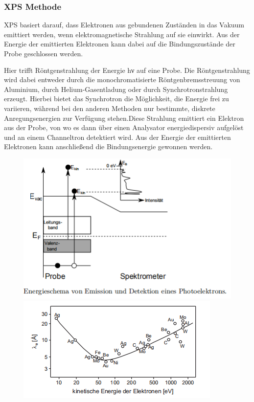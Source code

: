 \documentclass[12pt,UTF8]{article}
\begin{document}
\subsubsection{XPS Methode}
XPS basiert darauf, dass Elektronen aus gebundenen Zuständen in das Vakuum emittiert werden, wenn elektromagnetische Strahlung auf sie einwirkt. Aus der Energie der emittierten Elektronen kann dabei auf die Bindungszustände der Probe geschlossen werden.

Hier trifft Röntgenstrahlung der Energie hν auf eine Probe. Die Röntgenstrahlung wird dabei entweder durch die monochromatisierte Röntgenbremsstreuung von Aluminium, durch Helium-Gasentladung oder durch Synchrotronstrahlung erzeugt. Hierbei bietet das Synchrotron die Möglichkeit, die Energie frei zu variieren, während bei den anderen Methoden nur bestimmte, diskrete Anregungsenergien zur Verfügung stehen.Diese Strahlung emittiert ein Elektron aus der Probe, von wo es dann über einen Analysator energiedispersiv aufgelöst und an einem Channeltron detektiert wird. Aus der Energie der emittierten Elektronen kann anschließend die Bindungsenergie gewonnen werden.
\begin{figure}[H]
    \centering
    \begin{minipage}[t]{0.4\linewidth}
        \centering
        \includegraphics[width=\linewidth]{Diagramme/fig3_1_1.png}
        \caption{}
    \end{minipage}
    \begin{minipage}[t]{0.4\linewidth}
        \centering
        \includegraphics[width=\linewidth]{Diagramme/fig3_1_2.png}
        \caption{}
    \end{minipage}
\end{figure}
\end{document}

